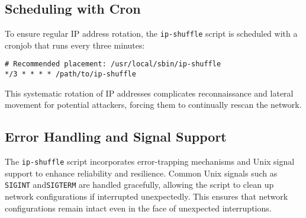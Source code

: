 \subsection{Scheduling with Cron}
To ensure regular IP address rotation, the \texttt{ip-shuffle} script is scheduled with a cronjob that runs every three minutes:
\begin{verbatim}
# Recommended placement: /usr/local/sbin/ip-shuffle
*/3 * * * * /path/to/ip-shuffle
\end{verbatim}
This systematic rotation of IP addresses complicates reconnaissance and lateral movement for potential attackers, forcing them to continually rescan the network.

\subsection{Error Handling and Signal Support}
The \texttt{ip-shuffle} script incorporates error-trapping mechanisms and Unix signal support to enhance reliability and resilience. Common Unix signals such as \texttt{SIGINT} and\texttt{SIGTERM} are handled gracefully, allowing the script to clean up network configurations if interrupted unexpectedly.
This ensures that network configurations remain intact even in the face of unexpected interruptions.